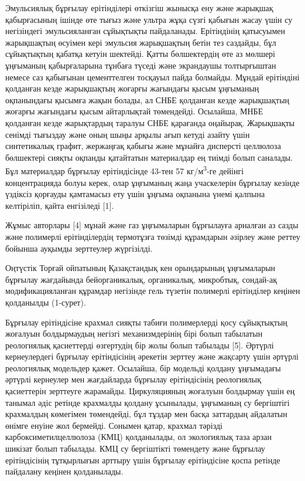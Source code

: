 \begin{multicols}{2}
Эмульсиялық бұрғылау ерітінділері өткізгіш жынысқа ену және жарықшақ
қабырғасының ішінде өте тығыз және ультра жұқа сүзгі қабығын жасау үшін
су негізіндегі эмульсияланған сұйықтықты пайдаланады. Ерітіндінің
қатысуымен жарықшақтың өсуімен кері эмульсия жарықшақтың бетін тез
саздайды, бұл сұйықтықтың қабатқа кетуін шектейді. Қатты бөлшектердің
өте аз мөлшері ұңғыманың қабырғаларына тұнбаға түседі және экрандаушы
толтырғыштан немесе саз қабығынан цементтелген тосқауыл пайда болмайды.
Мұндай ерітіндіні қолданған кезде жарықшақтың жоғарғы жағындағы қысым
ұңғыманың оқпанындағы қысымға жақын болады, ал СНБЕ қолданған кезде
жарықшақтың жоғарғы жағындағы қысым айтарлықтай төмендейді. Осылайша,
МНБЕ қолданған кезде жарықтардың таралуы СНБЕ қарағанда оңайырақ.
Жарықшақты сенімді тығыздау және оның шыңы арқылы ағып кетуді азайту
үшін синтетикалық графит, жержаңғақ қабығы және мұнайға дисперсті
целлюлоза бөлшектері сияқты оқпанды қатайтатын материалдар ең тиімді
болып саналады. Бұл материалдар бұрғылау ерітіндісінде 43-тен 57
кг/м\textsuperscript{3}-ге дейінгі концентрацияда болуы керек, олар
ұңғыманың жаңа учаскелерін бұрғылау кезінде үздіксіз қорғауды қамтамасыз
ету үшін ұңғыма оқпанына үнемі қалпына келтіріліп, қайта енгізіледі
{[}1{]}.

Жұмыс авторлары {[}4{]} мұнай және газ ұңғымаларын бұрғылауға арналған
аз сазды және полимерлі ерітінділердің термотұзға төзімді құрамдарын
әзірлеу және реттеу бойынша ауқымды зерттеулер жүргізілді.

Оңтүстік Торғай ойпатының Қазақстандық кен орындарының ұңғымаларын
бұрғылау жағдайында бейорганикалық, органикалық, микробтық, сондай-ақ
модификацияланған құрамдар негізінде гель түзетін полимерлі ерітінділер
кеңінен қолданылды (1-сурет).

Бұрғылау ерітіндісіне крахмал сияқты табиғи полимерлерді қосу
сұйықтықтың жоғалуын болдырмаудың негізгі механизмдерінің бірі болып
табылатын реологиялық қасиеттерді өзгертудің бір жолы болып табылады
{[}5{]}. Әртүрлі кернеулердегі бұрғылау ерітіндісінің әрекетін зерттеу
және жақсарту үшін әртүрлі реологиялық модельдер қажет. Осылайша, бір
модельді қолдану ұңғымадағы әртүрлі кернеулер мен жағдайларда бұрғылау
ерітіндісінің реологиялық қасиеттерін зерттеуге жарамайды. Циркуляцияның
жоғалуын болдырмау үшін ең танымал әдіс ретінде крахмалды қолдану
ұсынылады, ұңғыманың су бергіштігі крахмалдың көмегімен төмендейді, бұл
тұздар мен басқа заттардың айдалатын өнімге енуіне жол бермейді. Сонымен
қатар, крахмал тәрізді карбоксиметилцеллюлоза (КМЦ) қолданылады, ол
экологиялық таза арзан шикізат болып табылады. КМЦ су бергіштікті
төмендету және бұрғылау ерітіндісінің тұтқырлығын арттыру үшін бұрғылау
ерітіндісіне қоспа ретінде пайдалану кеңінен қолданылады.
\end{multicols}
 
